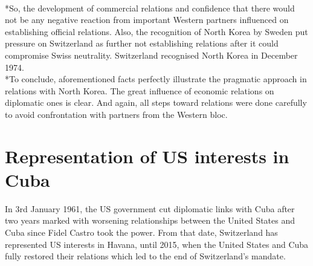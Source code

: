 \documentclass[a4paper]{article}
\begin{document}
\\*So, the development of commercial relations and confidence that there would not be any negative reaction from important Western partners influenced on establishing official relations. Also, the recognition of North Korea by Sweden put pressure on Switzerland as further not establishing relations after it could compromise Swiss neutrality. Switzerland recognised North Korea in December 1974.
\\*To conclude, aforementioned facts perfectly illustrate the pragmatic approach in relations with North Korea. The great influence of economic relations on diplomatic ones is clear. And again, all steps toward relations were done carefully to avoid confrontation with partners from the Western bloc.
\clearpage
\section{Representation of US interests in Cuba}
In 3rd January 1961, the US government cut diplomatic links with Cuba after two years marked with worsening relationships between the United States and Cuba since Fidel Castro took the power. 
From that date, Switzerland has represented US interests in Havana, until 2015, when the United States and Cuba fully restored their relations which led to the end of Switzerland’s mandate. 
\end{document}
